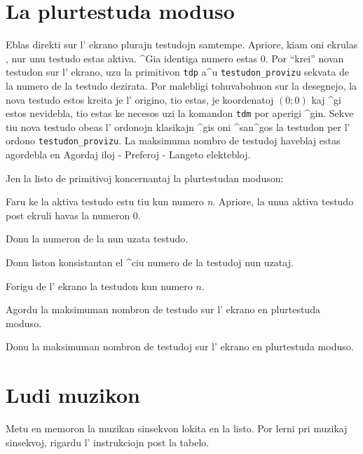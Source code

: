 \section{La plurtestuda moduso}

Eblas direkti sur l' ekrano plurajn testudojn samtempe.  Apriore, kiam
oni ekrulas \xlogo, nur unu testudo estas aktiva.  ^Gia identiga
numero estas $0$.  Por ``krei'' novan testudon sur l' ekrano, uzu la
primitivon \texttt{tdp} a^u \texttt{testudon\_provizu} sekvata de la
numero de la testudo dezirata.  Por malebligi tohuvabohuon sur la
desegnejo, la nova testudo estos kreita je l' origino, tio estas, je
koordenatoj $(0;0)$ kaj ^gi estos nevidebla, tio estas ke necesos uzi
la komandon \texttt{tdm} por aperigi ^gin.  Sekve tiu nova testudo
obeas l' ordonojn klasikajn ^gis oni ^san^gos la testudon per l'
ordono \texttt{testudon\_provizu}.  La maksimuma nombro de testudoj
haveblaj estas agordebla en Agordaj iloj - Preferoj - Langeto
elektebloj.

Jen la listo de primitivoj koncernantaj la plurtestudan moduson:


Faru ke la aktiva testudo estu tiu kun numero \textit{n}.  Apriore, la
unua aktiva testudo post ekruli \xlogo{} havas la numeron $0$.


Donu la numeron de la nun uzata testudo.


Donu liston konsistantan el ^ciu numero de la testudoj nun uzataj.


Forigu de l' ekrano la testudon kun numero $n$.


Agordu la maksimuman nombron de testudo sur l' ekrano en plurtestuda moduso.


Donu la maksimuman nombron de testudoj sur l' ekrano en plurtestuda moduso.

\section{Ludi muzikon}


Metu en memoron la muzikan sinsekvon lokita en la listo.
Por lerni pri muzikaj sinsekvoj, rigardu l' instrukciojn
post la tabelo.

